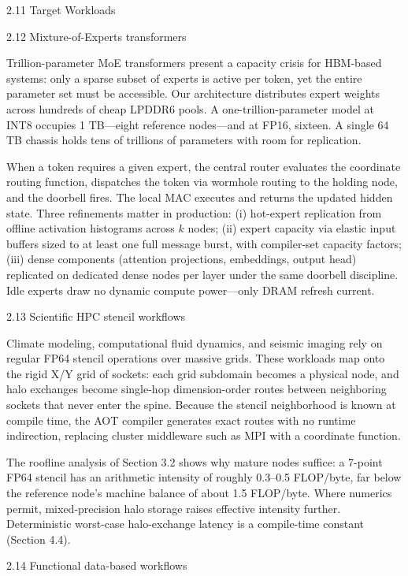 \documentclass[10pt,twocolumn]{article}
\begin{document}
2.11 Target Workloads

2.12 Mixture-of-Experts transformers

Trillion-parameter MoE transformers present a capacity crisis for HBM-based systems: only a sparse subset of experts is active per token, yet the entire parameter set must be accessible\cite{3,4}. Our architecture distributes expert weights across hundreds of cheap LPDDR6 pools. A one-trillion-parameter model at INT8 occupies 1 TB---eight reference nodes---and at FP16, sixteen. A single 64 TB chassis holds tens of trillions of parameters with room for replication.

When a token requires a given expert, the central router evaluates the coordinate routing function, dispatches the token via wormhole routing to the holding node, and the doorbell fires. The local MAC executes and returns the updated hidden state. Three refinements matter in production: (i) hot-expert replication from offline activation histograms across $k$ nodes; (ii) expert capacity via elastic input buffers sized to at least one full message burst, with compiler-set capacity factors; (iii) dense components (attention projections, embeddings, output head) replicated on dedicated dense nodes per layer under the same doorbell discipline. Idle experts draw no dynamic compute power---only DRAM refresh current.

2.13 Scientific HPC stencil workflows

Climate modeling, computational fluid dynamics, and seismic imaging rely on regular FP64 stencil operations over massive grids. These workloads map onto the rigid X/Y grid of sockets: each grid subdomain becomes a physical node, and halo exchanges become single-hop dimension-order routes between neighboring sockets that never enter the spine. Because the stencil neighborhood is known at compile time, the AOT compiler generates exact routes with no runtime indirection, replacing cluster middleware such as MPI\cite{19} with a coordinate function.

The roofline analysis of Section 3.2 shows why mature nodes suffice: a 7-point FP64 stencil has an arithmetic intensity of roughly 0.3--0.5 FLOP/byte, far below the reference node's machine balance of about 1.5 FLOP/byte\cite{5}. Where numerics permit, mixed-precision halo storage raises effective intensity further. Deterministic worst-case halo-exchange latency is a compile-time constant (Section 4.4).

2.14 Functional data-based workflows
\end{document}

